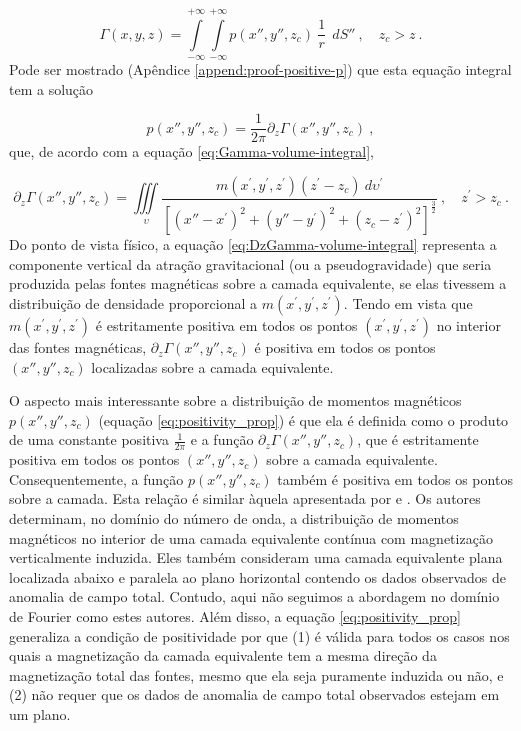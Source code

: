 \begin{equation}
\Gamma(x, y, z) = 
\int\limits_{-\infty}^{+\infty}\int\limits_{-\infty}^{+\infty}
p(x'', y'', z_{c}) \: \frac{1}{r} \:\: dS'' \: ,
\quad z_{c} > z \: .
\label{eq:Gamma_integral_equation}
\end{equation} 
Pode ser mostrado (Apêndice \ref{append:proof-positive-p}) que esta equação integral tem a solução

\begin{equation}
p(x'', y'', z_{c}) = \frac{1}{2\pi} \partial_{z} \Gamma(x'', y'', z_{c}) \: ,
\label{eq:positivity_prop}
\end{equation}
que, de acordo com a equação \ref{eq:Gamma-volume-integral}, 

\begin{equation}
\partial_{z} \Gamma(x'', y'', z_{c}) = \iiint\limits_{\upsilon} 
\frac{m(x^{\prime}, y^{\prime}, z^{\prime}) (z^{\prime} - z_{c}) \: 
d\upsilon^{\prime}}
{\left[ (x''-x^{\prime})^2 + (y''-y^{\prime})^2 + (z_{c}-z^{\prime})^2 \right]^{\frac{3}{2}}} \: , \quad z^{\prime} > z_{c} \: .
\label{eq:DzGamma-volume-integral}
\end{equation}
Do ponto de vista físico, a equação \ref{eq:DzGamma-volume-integral} representa a componente vertical da atração gravitacional (ou a pseudogravidade) que seria produzida pelas fontes magnéticas sobre a camada equivalente, se elas tivessem a distribuição de densidade proporcional a $m(x^{\prime}, y^{\prime}, z^{\prime})$. Tendo em vista que $m(x^{\prime}, y^{\prime}, z^{\prime})$ é estritamente positiva em todos os pontos $(x^{\prime}, y^{\prime}, z^{\prime})$ no interior das fontes magnéticas, $\partial_{z} \Gamma(x'', y'', z_{c})$ é positiva em todos os pontos $(x'', y'', z_{c})$ localizadas sobre a camada equivalente.

O aspecto mais interessante sobre a distribuição de momentos magnéticos $p(x'', y'', z_{c})$ (equação \ref{eq:positivity_prop}) é que ela é definida como o produto de uma constante positiva $\frac{1}{2\pi}$ e a função $\partial_{z} \Gamma(x'',y'',z_{c})$, que é estritamente positiva em todos os pontos $(x'',y'',z_{c})$ sobre a camada equivalente. Consequentemente, a função $p(x'', y'', z_{c})$ também é positiva em todos os pontos sobre a camada. Esta relação é similar àquela apresentada por \cite{pedersen1991} e \cite{li_etal_2014}. Os autores determinam, no domínio do número de onda, a distribuição de momentos magnéticos no interior de uma camada equivalente contínua com magnetização verticalmente induzida. Eles também consideram uma camada equivalente plana localizada abaixo e paralela ao plano horizontal contendo os dados observados de anomalia de campo total. Contudo, aqui não seguimos a abordagem no domínio de Fourier como estes autores. Além disso, a equação \ref{eq:positivity_prop}  generaliza a condição de positividade por que (1) é válida para todos os casos nos quais a magnetização da camada equivalente tem a mesma direção da magnetização total das fontes, mesmo que ela seja puramente induzida ou não, e (2) não requer que os dados de anomalia de campo total observados estejam em um plano.
